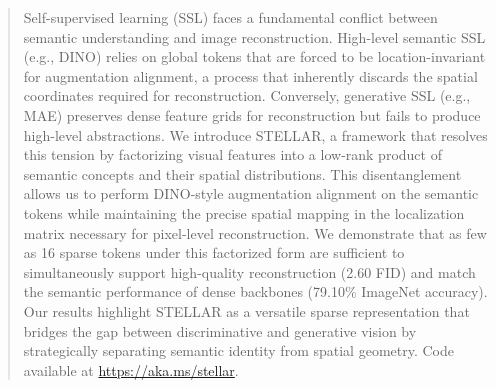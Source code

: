 \begin{abstract}
Self-supervised learning (SSL) faces a fundamental conflict between semantic understanding and image reconstruction. High-level semantic SSL (e.g., DINO) relies on global tokens that are forced to be location-invariant for augmentation alignment, a process that inherently discards the spatial coordinates required for reconstruction. Conversely, generative SSL (e.g., MAE) preserves dense feature grids for reconstruction but fails to produce high-level abstractions. We introduce STELLAR, a framework that resolves this tension by factorizing visual features into a low-rank product of semantic concepts and their spatial distributions. This disentanglement allows us to perform DINO-style augmentation alignment on the semantic tokens while maintaining the precise spatial mapping in the localization matrix necessary for pixel-level reconstruction. We demonstrate that as few as 16 sparse tokens under this factorized form are sufficient to simultaneously support high-quality reconstruction (2.60 FID) and match the semantic performance of dense backbones (79.10\% ImageNet accuracy). Our results highlight STELLAR as a versatile sparse representation that bridges the gap between discriminative and generative vision by strategically separating semantic identity from spatial geometry. Code available at \url{https://aka.ms/stellar}.


\end{abstract}